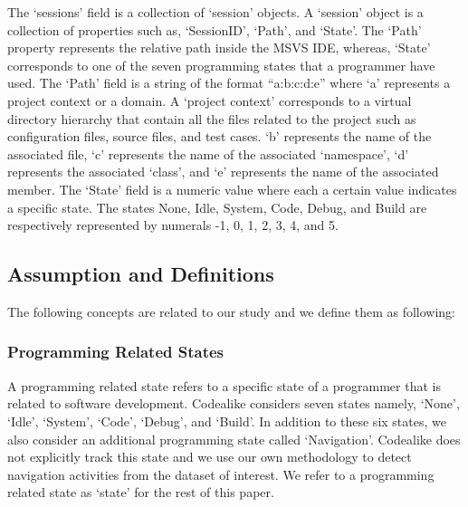 The `sessions' field is a collection of `session' objects. A `session' object is a collection of properties such as, `SessionID', `Path', and `State'. The `Path' property represents the relative path inside the MSVS IDE, whereas, `State' corresponds to one of the seven programming states that a programmer have used. The `Path' field is a string of the format ``a:b:c:d:e'' where `a' represents a project context or a domain. A `project context' corresponds to a virtual directory hierarchy that contain all the files related to the project such as configuration files, source files, and test cases. `b' represents the name of the associated file, `c' represents the name of the associated `namespace', `d' represents the associated `class', and `e' represents the name of the associated member.  The `State' field is a numeric value where each a certain value indicates a specific state. The states None, Idle, System, Code, Debug, and Build are respectively represented by numerals -1, 0, 1, 2, 3, 4, and 5.



\subsection{Assumption and Definitions}
The following concepts are related to our study and we define them as following:
\subsubsection{Programming Related States}
A programming related state refers to a specific state of a programmer that is related to software development.  Codealike considers seven states namely, `None', `Idle', `System', `Code', `Debug', and `Build'. In addition to these six states, we also consider an additional programming state called `Navigation'. Codealike does not explicitly track this state and we use our own methodology to detect navigation activities from the dataset of interest.    
We refer to a programming related state as `state' for the rest of this paper.
